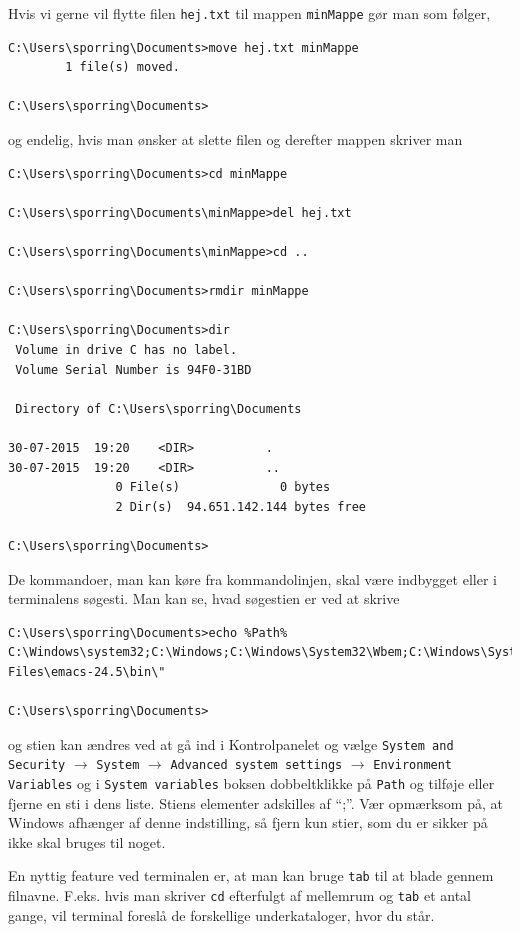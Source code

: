 \documentclass[a4paper]{article}
\begin{document}
Hvis vi gerne vil flytte filen \verb|hej.txt| til mappen \verb|minMappe| gør man som følger,
\begin{lstlisting}[frame=single]
C:\Users\sporring\Documents>move hej.txt minMappe
        1 file(s) moved.

C:\Users\sporring\Documents>
\end{lstlisting}
og endelig, hvis man ønsker at slette filen og derefter mappen skriver man
\begin{lstlisting}[frame=single]
C:\Users\sporring\Documents>cd minMappe

C:\Users\sporring\Documents\minMappe>del hej.txt

C:\Users\sporring\Documents\minMappe>cd ..

C:\Users\sporring\Documents>rmdir minMappe

C:\Users\sporring\Documents>dir
 Volume in drive C has no label.
 Volume Serial Number is 94F0-31BD

 Directory of C:\Users\sporring\Documents

30-07-2015  19:20    <DIR>          .
30-07-2015  19:20    <DIR>          ..
               0 File(s)              0 bytes
               2 Dir(s)  94.651.142.144 bytes free

C:\Users\sporring\Documents>
\end{lstlisting}
De kommandoer, man kan køre fra kommandolinjen, skal være indbygget eller i terminalens søgesti. Man kan se, hvad søgestien er ved at skrive
\begin{lstlisting}[frame=single]
C:\Users\sporring\Documents>echo %Path%
C:\Windows\system32;C:\Windows;C:\Windows\System32\Wbem;C:\Windows\System32\WindowsPowerShell\v1.0\;"\Program Files\emacs-24.5\bin\"

C:\Users\sporring\Documents>
\end{lstlisting}
og stien kan ændres ved at gå ind i Kontrolpanelet og vælge \verb|System and Security| $\rightarrow$ \verb|System| $\rightarrow$ \verb|Advanced system settings| $\rightarrow$ \verb|Environment Variables| og i \verb|System variables| boksen dobbeltklikke på \verb|Path| og tilføje eller fjerne en sti i dens liste. Stiens elementer adskilles af "`;"'. Vær opmærksom på, at Windows afhænger af denne indstilling, så fjern kun stier, som du er sikker på ikke skal bruges til noget.

En nyttig feature ved terminalen er, at man kan bruge \verb|tab| til at blade gennem filnavne.  F.eks. hvis man skriver \verb|cd| efterfulgt af mellemrum og \verb|tab| et antal gange, vil terminal foreslå de forskellige underkataloger, hvor du står.
\end{document}
